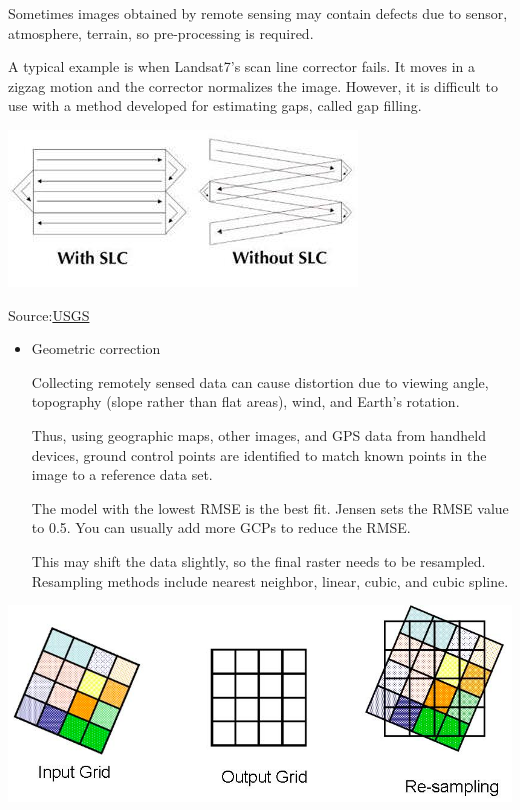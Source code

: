 \documentclass[
  letterpaper,
  DIV=11,
  numbers=noendperiod]{scrreprt}
\begin{document}
Sometimes images obtained by remote sensing may contain defects due to
sensor, atmosphere, terrain, so pre-processing is required.

A typical example is when Landsat7's scan line corrector fails. It moves
in a zigzag motion and the corrector normalizes the image. However, it
is difficult to use with a method developed for estimating gaps, called
gap filling.

\includegraphics{./images/paste-99A45A8B.png}

Source:\href{https://www.usgs.gov/landsat-missions/landsat-7?qt-science_support_page_related_con=0\#qt-science_support_page_related_con}{USGS}

\begin{itemize}
\item
  Geometric correction

  Collecting remotely sensed data can cause distortion due to viewing
  angle, topography (slope rather than flat areas), wind, and Earth's
  rotation.

  Thus, using geographic maps, other images, and GPS data from handheld
  devices, ground control points are identified to match known points in
  the image to a reference data set.

  The model with the lowest RMSE is the best fit. Jensen sets the RMSE
  value to 0.5. You can usually add more GCPs to reduce the RMSE.

  This may shift the data slightly, so the final raster needs to be
  resampled. Resampling methods include nearest neighbor, linear, cubic,
  and cubic spline.
\end{itemize}

\includegraphics{./images/paste-0481E9FB.png}
\end{document}
